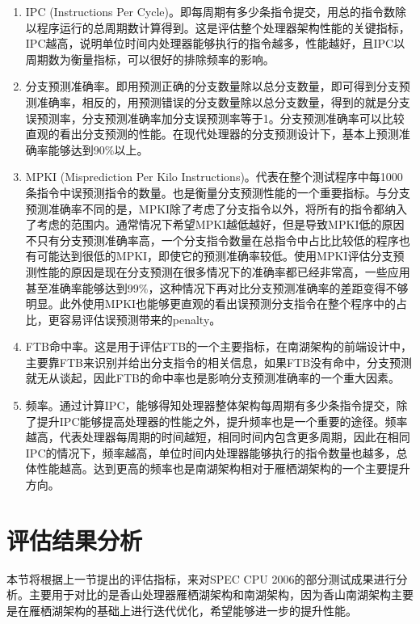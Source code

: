 \begin{enumerate}
	\item IPC (Instructions Per Cycle)。即每周期有多少条指令提交，用总的指令数除以程序运行的总周期数计算得到。这是评估整个处理器架构性能的关键指标，IPC越高，说明单位时间内处理器能够执行的指令越多，性能越好，且IPC以周期数为衡量指标，可以很好的排除频率的影响。
	\item 分支预测准确率。即用预测正确的分支数量除以总分支数量，即可得到分支预测准确率，相反的，用预测错误的分支数量除以总分支数量，得到的就是分支误预测率，分支预测准确率加分支误预测率等于1。分支预测准确率可以比较直观的看出分支预测的性能。在现代处理器的分支预测设计下，基本上预测准确率能够达到90\%以上。
	\item MPKI (Misprediction Per Kilo Instructions)。代表在整个测试程序中每1000条指令中误预测指令的数量。也是衡量分支预测性能的一个重要指标。与分支预测准确率不同的是，MPKI除了考虑了分支指令以外，将所有的指令都纳入了考虑的范围内。通常情况下希望MPKI越低越好，但是导致MPKI低的原因不只有分支预测准确率高，一个分支指令数量在总指令中占比比较低的程序也有可能达到很低的MPKI，即使它的预测准确率较低。使用MPKI评估分支预测性能的原因是现在分支预测在很多情况下的准确率都已经非常高，一些应用甚至准确率能够达到99\%，这种情况下再对比分支预测准确率的差距变得不够明显。此外使用MPKI也能够更直观的看出误预测分支指令在整个程序中的占比，更容易评估误预测带来的penalty。
	\item FTB命中率。这是用于评估FTB的一个主要指标，在南湖架构的前端设计中，主要靠FTB来识别并给出分支指令的相关信息，如果FTB没有命中，分支预测就无从谈起，因此FTB的命中率也是影响分支预测准确率的一个重大因素。
	\item 频率。通过计算IPC，能够得知处理器整体架构每周期有多少条指令提交，除了提升IPC能够提高处理器的性能之外，提升频率也是一个重要的途径。频率越高，代表处理器每周期的时间越短，相同时间内包含更多周期，因此在相同IPC的情况下，频率越高，单位时间内处理器能够执行的指令数量也越多，总体性能越高。达到更高的频率也是南湖架构相对于雁栖湖架构的一个主要提升方向。
\end{enumerate}

\section{评估结果分析}

本节将根据上一节提出的评估指标，来对SPEC CPU 2006的部分测试成果进行分析。主要用于对比的是香山处理器雁栖湖架构和南湖架构，因为香山南湖架构主要是在雁栖湖架构的基础上进行迭代优化，希望能够进一步的提升性能。

